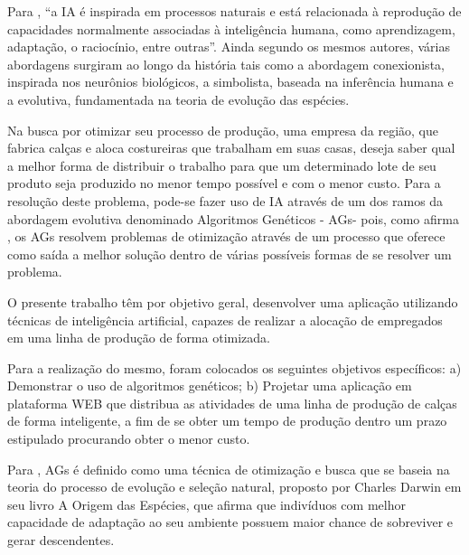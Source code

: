 \par Para , “a IA é inspirada  em  
processos naturais e está relacionada à reprodução de   capacidades  
normalmente   associadas   à   inteligência   humana,   como aprendizagem,
adaptação,   o   raciocínio,   entre   outras”.   Ainda   segundo   os   mesmos
autores,   várias  abordagens   surgiram   ao   longo   da   história   tais   como  
a abordagem   conexionista,   inspirada   nos  neurônios   biológicos,   a  
simbolista, baseada   na   inferência   humana   e   a   evolutiva, fundamentada na teoria
de evolução das espécies.

\par Na busca por otimizar seu processo de produção, uma empresa da região, que
fabrica calças e aloca costureiras que trabalham em suas casas, deseja saber
qual a melhor forma de distribuir o trabalho para que um determinado lote de seu produto
seja produzido no menor tempo possível e com o menor custo. Para a resolução
deste problema, pode-se fazer uso de IA através de um dos ramos da abordagem
evolutiva denominado Algoritmos Genéticos - AGs\footnotemark[2] - pois, como
afirma , os AGs resolvem problemas de
otimização através de um processo que oferece como saída a melhor solução
dentro de várias possíveis formas de se resolver um problema.



\par O presente trabalho têm por objetivo geral, desenvolver uma aplicação
utilizando técnicas de inteligência artificial, capazes de realizar a alocação
de empregados em uma linha de produção de forma otimizada. 
\par Para a realização do mesmo, foram colocados os seguintes objetivos
específicos: a) Demonstrar o uso de algoritmos genéticos; b) Projetar uma aplicação em plataforma WEB que distribua as
atividades de uma linha de produção de calças de forma inteligente, a fim de se
obter um tempo de produção dentro um prazo estipulado procurando obter o menor custo.

\par Para , AGs é definido
como uma técnica de otimização e busca que se baseia na teoria do processo de evolução e seleção
natural, proposto por Charles Darwin em seu livro A Origem das Espécies, que
afirma que indivíduos com melhor capacidade de adaptação ao seu ambiente possuem
maior chance de sobreviver e gerar descendentes.

